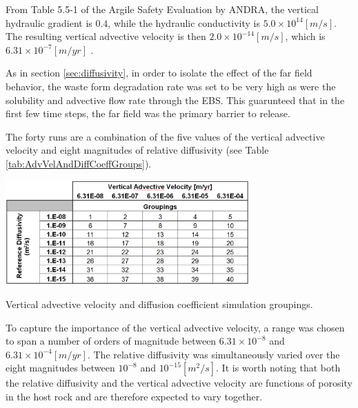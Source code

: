 From Table 5.5-1 of the Argile Safety Evaluation by \gls{ANDRA}, the vertical 
hydraulic gradient is $0.4$, while the hydraulic conductivity is $5.0\times10^{14} 
[m/s]$. The resulting vertical advective velocity is then $2.0\times10^{-14}[m/s]$, which is 
$6.31\times10^{-7}[m/yr]$  \cite{andra_argile:_2005}. %


As in section \ref{sec:diffusivity}, in order to isolate the effect of the far 
field behavior, the waste form degradation rate was set to be very high as were 
the solubility and advective flow rate through the  \gls{EBS}. This guarunteed 
that in the first few time steps, the far field was the primary barrier to 
release. 

The forty runs are a combination of the five values of the vertical advective 
velocity and eight magnitudes of relative diffusivity (see Table 
\ref{tab:AdvVelAndDiffCoeffGroups}). 

\begin{table}[hbp!]
\centering
\includegraphics[width=0.7\textwidth]{./chapters/nuclide_sensitivity/clay/AdvVelAndDiffCoeffEBSFail/AdvVelAndDiffCoeffGroups.eps}
\caption{Vertical advective velocity and diffusion coefficient simulation groupings.}
\label{tab:AdvVelAndDiffCoeffGroups}
\end{table}


To capture the importance of the vertical advective velocity, a range was chosen 
to span a number of orders of magnitude between $ 6.31\times 10^{-8}$ 
and $ 6.31\times10^{-4} [m/yr]$. The relative diffusivity was simultaneously varied 
over the eight magnitudes between $ 10^{-8}$ and $ 10^{-15} [m^2/s]$. It is 
worth noting that both the relative diffusivity and the vertical advective 
velocity are functions of porosity in the host rock and are therefore expected 
to vary together. 



